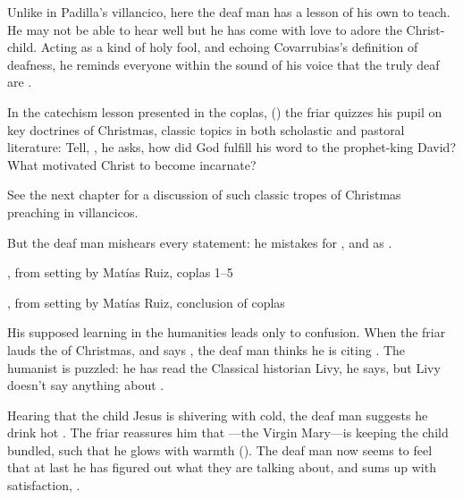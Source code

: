Unlike in Padilla's villancico, here the deaf man has a lesson of his own to 
teach.
He may not be able to hear well but he has come with love to adore the 
Christ-child. 
Acting as a kind of holy fool, and echoing Covarrubias's definition of 
deafness, he reminds everyone within the sound of his voice that the truly deaf 
are .

In the catechism lesson presented in the coplas, 
() the friar quizzes his pupil 
on key doctrines of Christmas, classic topics in both scholastic and pastoral 
literature:
Tell, , he asks, how did God fulfill his word to the prophet-king 
David?
What motivated Christ to become incarnate?%
    \begin{Footnote}
        See the next chapter for a discussion of such classic tropes of 
        Christmas preaching in villancicos.
    \end{Footnote}
But the deaf man mishears every statement: he mistakes  for 
, and  as 
.

\begin{expoem}
    \caption{, 
    from setting by Matías Ruiz, coplas 1--5}
    \label{expoem:Pues_la_fiesta-Ruiz-coplas-1}
\end{expoem}

\begin{expoem}
    \caption{, 
    from setting by Matías Ruiz, conclusion of coplas}
    \label{expoem:Pues_la_fiesta-Ruiz-coplas-2}
\end{expoem}

His supposed learning in the humanities leads only to confusion.
When the friar lauds the  of Christmas, and says 
, the deaf man 
thinks he is citing .
The humanist is puzzled: he has read the Classical historian Livy, he says, but 
Livy doesn't say anything about .

Hearing that the child Jesus is shivering with cold, the deaf man suggests he 
drink hot .
The friar reassures him that ---the Virgin Mary---is keeping 
the child bundled, such that he glows with warmth ().
The deaf man now seems to feel that at last he has figured out what they are 
talking about, and sums up with satisfaction, .

